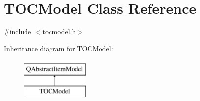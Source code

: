 \hypertarget{classTOCModel}{\section{T\+O\+C\+Model Class Reference}
\label{classTOCModel}
}


{\ttfamily \#include $<$tocmodel.\+h$>$}

Inheritance diagram for T\+O\+C\+Model\+:\begin{figure}[H]
\begin{center}
\leavevmode
\includegraphics[height=2.000000cm]{classTOCModel}
\end{center}
\end{figure}
